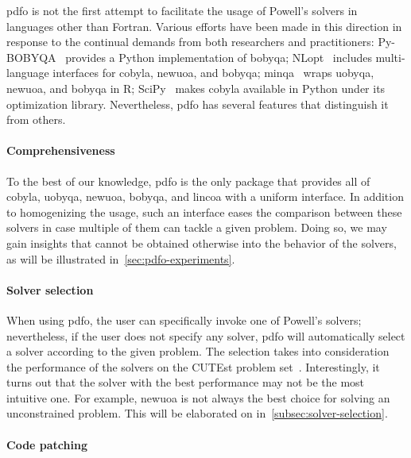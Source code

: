 \Gls{pdfo} is not the first attempt to facilitate the usage of Powell's solvers in languages other than Fortran.
Various efforts have been made in this direction in response to the continual demands from both researchers and practitioners: Py-BOBYQA~\cite{Cartis_Etal_2019} provides a Python implementation of \gls{bobyqa}; NLopt~\cite{Johnson_2019} includes multi-language interfaces for \gls{cobyla}, \gls{newuoa}, and \gls{bobyqa}; minqa~\cite{Bates_Etal_2014} wraps \gls{uobyqa}, \gls{newuoa}, and \gls{bobyqa} in R; SciPy~\cite{Virtanen_Etal_2020} makes \gls{cobyla} available in Python under its optimization library.
Nevertheless, \gls{pdfo} has several features that distinguish it from others.

\paragraph{Comprehensiveness}

To the best of our knowledge, \gls{pdfo} is the only package that provides all of \gls{cobyla}, \gls{uobyqa}, \gls{newuoa}, \gls{bobyqa}, and \gls{lincoa} with a uniform interface.
In addition to homogenizing the usage, such an interface eases the comparison between these solvers in case multiple of them can tackle a given problem.
Doing so, we may gain insights that cannot be obtained otherwise into the behavior of the solvers, as will be illustrated in~\cref{sec:pdfo-experiments}.

\paragraph{Solver selection}

When using \gls{pdfo}, the user can specifically invoke one of Powell's solvers; nevertheless, if the user does not specify any solver, \gls{pdfo} will automatically select a solver according to the given problem.
The selection takes into consideration the performance of the solvers on the CUTEst problem set~\cite{Gould_Orban_Toint_2015}.
Interestingly, it turns out that the solver with the best performance may not be the most intuitive one.
For example, \gls{newuoa} is not always the best choice for solving an unconstrained problem.
This will be elaborated on in~\cref{subsec:solver-selection}.

\paragraph{Code patching}

